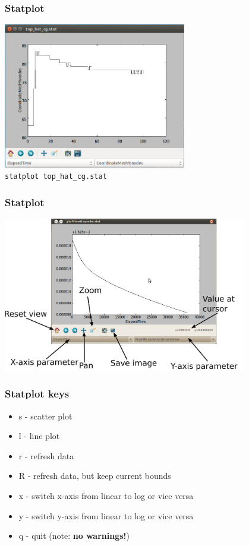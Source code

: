 \documentclass[12pt]{beamer}
\begin{document}
\begin{frame}
    \frametitle{Statplot}
\begin{center}
\includegraphics[width=0.6\textwidth]{images/statplot.png}\\
\texttt{statplot top\_hat\_cg.stat}
\end{center}
\end{frame}

\begin{frame}
    \frametitle{Statplot}
\begin{center}
\includegraphics[width=0.8\textwidth]{images/statplot_labelled.png}
\end{center}
\end{frame}

\begin{frame}
    \frametitle{Statplot keys}
\begin{itemize}
\item s - scatter plot
\item l - line plot
\item r - refresh data
\item R - refresh data, but keep current bounds
\item x - switch x-axis from linear to log or vice versa
\item y - switch y-axis from linear to log or vice versa
\item q - quit (note: \textbf{no warnings!})
\end{itemize}
\end{frame}
\end{document}
